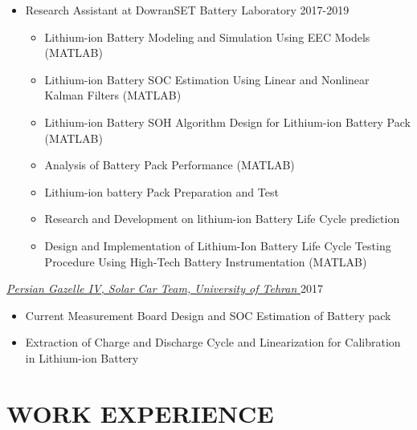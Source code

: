 \documentclass[10pt,a4paper,sans]{moderncv} %
\begin{document}
		\begin{itemize}[nosep, leftmargin=0.9cm ]
		    \item Research Assistant at DowranSET Battery Laboratory \hfill 2017-2019
		    \begin{itemize}[nosep]
		        \item Lithium-ion Battery Modeling and Simulation Using EEC Models (MATLAB) %
		        \item Lithium-ion Battery SOC Estimation Using Linear and Nonlinear Kalman Filters (MATLAB) %
		        \item Lithium-ion Battery SOH Algorithm Design for Lithium-ion Battery Pack (MATLAB)
		        \item Analysis of Battery Pack Performance (MATLAB)
		        \item Lithium-ion battery Pack Preparation and Test
		        \item Research and Development on lithium-ion Battery Life Cycle prediction 
		        \item Design and Implementation of Lithium-Ion Battery Life Cycle Testing Procedure Using High-Tech Battery Instrumentation (MATLAB) %
		    \end{itemize}
		\end{itemize}
		
		\vspace{0.5em}
		
		\href{https://pgsc.ut.ac.ir/en/}{ \emph{Persian Gazelle IV, Solar Car Team, University of Tehran }} \hfill 2017
    	\begin{itemize}[nosep, leftmargin=0.9cm ]
    	    \item Current Measurement Board Design and SOC Estimation of Battery pack
    	    \item Extraction of Charge and Discharge Cycle and Linearization for Calibration in Lithium-ion Battery
    	\end{itemize}
	    
	\section{WORK EXPERIENCE}
	
\end{document}
